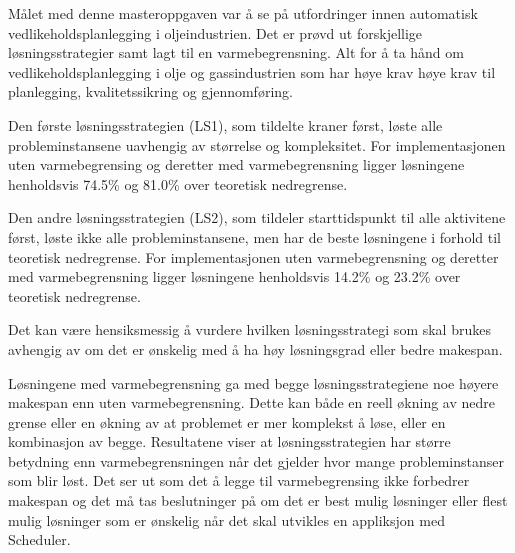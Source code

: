 Målet med denne masteroppgaven var å se på utfordringer innen automatisk vedlikeholdsplanlegging i oljeindustrien. Det er prøvd ut forskjellige løsningsstrategier samt lagt til en varmebegrensning. Alt for å ta hånd om vedlikeholdsplanlegging i olje og gassindustrien som har høye krav høye krav til planlegging, kvalitetssikring og gjennomføring.

Den første løsningsstrategien (LS1), som tildelte kraner først, løste alle probleminstansene uavhengig av størrelse og kompleksitet. For implementasjonen uten varmebegrensing og deretter med varmebegrensning ligger løsningene henholdsvis 74.5\% og 81.0\% over teoretisk nedregrense. 

Den andre løsningsstrategien (LS2), som tildeler starttidspunkt til alle aktivitene først, løste ikke alle probleminstansene, men har de beste løsningene i forhold til teoretisk nedregrense. For implementasjonen uten varmebegrensning og deretter med varmebegrensning ligger løsningene henholdsvis 14.2\% og 23.2\% over teoretisk nedregrense.

Det kan være hensiksmessig å vurdere hvilken løsningsstrategi som skal brukes avhengig av om det er ønskelig med å ha høy løsningsgrad eller bedre makespan.

Løsningene med varmebegrensning ga med begge løsningsstrategiene noe høyere makespan enn uten varmebegrensning. Dette kan både en reell økning av nedre grense eller en økning av at problemet er mer komplekst å løse, eller en kombinasjon av begge. Resultatene viser at løsningsstrategien har større betydning enn varmebegrensningen når det gjelder hvor mange probleminstanser som blir løst. Det ser ut som det å legge til varmebegrensing ikke forbedrer makespan og det må tas beslutninger på om det er best mulig løsninger eller flest mulig løsninger som er ønskelig når det skal utvikles en appliksjon med Scheduler.